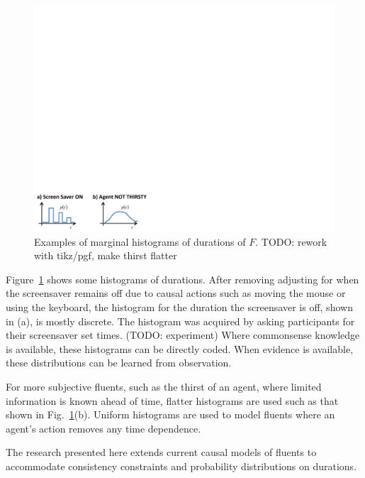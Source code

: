\documentclass[10pt,journal,letterpaper,compsoc]{IEEEtran}
\begin{document}
\begin{figure}[htp]
\centering
\includegraphics[trim = 0.1in 0.1in 6.25in 6.25in, clip, width=0.9\linewidth]{marginalfi.pdf}
\caption{Examples of marginal histograms of durations of $F$. 
TODO: rework with tikz/pgf, make thirst flatter
\label{fig:marginalfi}}
\end{figure}




Figure~\ref{fig:marginalfi} shows some histograms of durations.  After removing adjusting for when the screensaver remains off due to causal actions such as moving the mouse or using the keyboard, the histogram for the duration the screensaver is off, shown in (a), is mostly discrete.  The histogram was acquired by asking  participants for their screensaver set times.  (TODO: experiment)  Where commonsense knowledge is available, these histograms can be directly coded.  When evidence is available, these distributions can be learned from observation.

For more subjective fluents, such as the thirst of an agent, where limited information is known ahead of time, flatter histograms are used such as that shown in Fig.~\ref{fig:marginalfi}(b).  Uniform histograms are used to model fluents where an agent's action removes any time dependence.

The research presented here extends current causal models of fluents to accommodate consistency constraints and probability distributions on durations.
\end{document}

